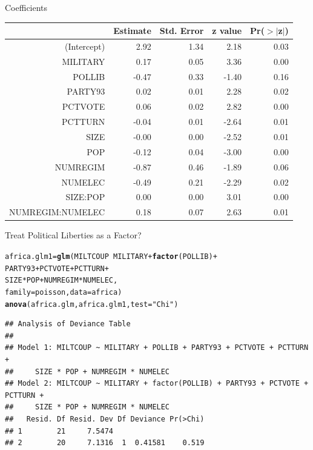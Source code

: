 \documentclass[handout]{beamer}\usepackage[]{graphicx}\usepackage[]{color}
\makeatletter
\newcommand{\hlstr}[1]{\textcolor[rgb]{0.192,0.494,0.8}{#1}}%
\newcommand{\hlopt}[1]{\textcolor[rgb]{0,0,0}{#1}}%
\newcommand{\hlstd}[1]{\textcolor[rgb]{0.345,0.345,0.345}{#1}}%
\newcommand{\hlkwb}[1]{\textcolor[rgb]{0.69,0.353,0.396}{#1}}%
\newcommand{\hlkwc}[1]{\textcolor[rgb]{0.333,0.667,0.333}{#1}}%
\newcommand{\hlkwd}[1]{\textcolor[rgb]{0.737,0.353,0.396}{\textbf{#1}}}%
\newenvironment{kframe}{%
 \def\at@end@of@kframe{}%
 \ifinner\ifhmode%
  \def\at@end@of@kframe{\end{minipage}}%
  \begin{minipage}{\columnwidth}%
 \fi\fi%
 \def\FrameCommand##1{\hskip\@totalleftmargin \hskip-\fboxsep
 \colorbox{shadecolor}{##1}\hskip-\fboxsep
     \hskip-\linewidth \hskip-\@totalleftmargin \hskip\columnwidth}%
 \MakeFramed {\advance\hsize-\width
   \@totalleftmargin\z@ \linewidth\hsize
   \@setminipage}}%
 {\par\unskip\endMakeFramed%
 \at@end@of@kframe}
\newenvironment{knitrout}{}{} %
\makeatother
\begin{document}
\begin{frame}[fragile]{Coefficients}
\begin{table}[ht]
\centering
\begin{tabular}{rrrrr}
  \hline
 & Estimate & Std. Error & z value & Pr($>$$|$z$|$) \\ 
  \hline
(Intercept) & 2.92 & 1.34 & 2.18 & 0.03 \\ 
  MILITARY & 0.17 & 0.05 & 3.36 & 0.00 \\ 
  POLLIB & -0.47 & 0.33 & -1.40 & 0.16 \\ 
  PARTY93 & 0.02 & 0.01 & 2.28 & 0.02 \\ 
  PCTVOTE & 0.06 & 0.02 & 2.82 & 0.00 \\ 
  PCTTURN & -0.04 & 0.01 & -2.64 & 0.01 \\ 
  SIZE & -0.00 & 0.00 & -2.52 & 0.01 \\ 
  POP & -0.12 & 0.04 & -3.00 & 0.00 \\ 
  NUMREGIM & -0.87 & 0.46 & -1.89 & 0.06 \\ 
  NUMELEC & -0.49 & 0.21 & -2.29 & 0.02 \\ 
  SIZE:POP & 0.00 & 0.00 & 3.01 & 0.00 \\ 
  NUMREGIM:NUMELEC & 0.18 & 0.07 & 2.63 & 0.01 \\ 
   \hline
\end{tabular}
\end{table}


\end{frame}


\begin{frame}[fragile]{Treat Political Liberties as a Factor?}
\begin{knitrout}
\color{fgcolor}\begin{kframe}
\begin{alltt}
\hlstd{africa.glm1} \hlkwb{=} \hlkwd{glm}\hlstd{(MILTCOUP} \hlopt{~} \hlstd{MILITARY} \hlopt{+} \hlkwd{factor}\hlstd{(POLLIB)} \hlopt{+}
                    \hlstd{PARTY93} \hlopt{+} \hlstd{PCTVOTE}\hlopt{+} \hlstd{PCTTURN} \hlopt{+}
                    \hlstd{SIZE}\hlopt{*}\hlstd{POP} \hlopt{+} \hlstd{NUMREGIM}\hlopt{*}\hlstd{NUMELEC,}
                    \hlkwc{family}\hlstd{=poisson,} \hlkwc{data}\hlstd{=africa)}
\hlkwd{anova}\hlstd{(africa.glm, africa.glm1,} \hlkwc{test}\hlstd{=}\hlstr{"Chi"}\hlstd{)}
\end{alltt}
\begin{verbatim}
## Analysis of Deviance Table
## 
## Model 1: MILTCOUP ~ MILITARY + POLLIB + PARTY93 + PCTVOTE + PCTTURN + 
##     SIZE * POP + NUMREGIM * NUMELEC
## Model 2: MILTCOUP ~ MILITARY + factor(POLLIB) + PARTY93 + PCTVOTE + PCTTURN + 
##     SIZE * POP + NUMREGIM * NUMELEC
##   Resid. Df Resid. Dev Df Deviance Pr(>Chi)
## 1        21     7.5474                     
## 2        20     7.1316  1  0.41581    0.519
\end{verbatim}
\end{kframe}
\end{knitrout}

\end{frame}
\end{document}
